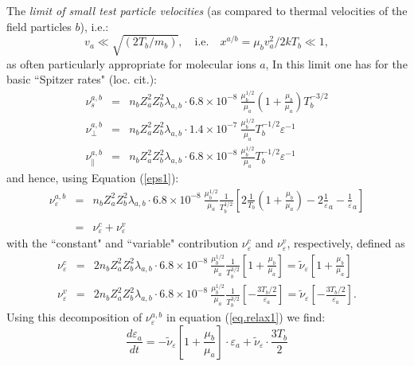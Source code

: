 \vspace{1cm}
The \emph{limit of small test particle velocities} (as compared to thermal velocities of the
field particles $b$), i.e.:
\begin{equation}\label{xab}
v_a\ll \sqrt{(2T_b/m_b)},\quad  \mbox{i.e.} \quad  x^{a/b} = \mu_bv_a^2/2kT_b \ll 1,
\end{equation}
as often particularly
appropriate for molecular ions $a$,
In this limit one has for the basic ``Spitzer
rates" (loc. cit.):
\begin{eqnarray}
\nu_s^{a,b} & = & n_b Z_a^2 Z_b^2\lambda_{a,b}\cdot
6.8 \times 10^{-8}~\frac{\mu_b^{1/2}}{\mu_a} \left(1+\frac{\mu_b}{\mu_a}\right)T_b^{-3/2}\\
\nu_\perp^{a,b} & = & n_b Z_a^2 Z_b^2\lambda_{a,b}\cdot 1.4 \times 10^{-7}~\frac{\mu_b^{1/2}}{\mu_a} T_b^{-1/2}\varepsilon^{-1}  \\
\nu_\parallel^{a,b} & = &  n_b Z_a^2 Z_b^2\lambda_{a,b}\cdot 6.8 \times 10^{-8}~\frac{\mu_b^{1/2}}{\mu_a} T_b^{-1/2}\varepsilon^{-1}
\end{eqnarray}
and hence, using Equation (\ref{eps1}):
\begin{eqnarray}
\nu_\varepsilon^{a,b} &=&  n_b Z_a^2 Z_b^2\lambda_{a,b}\cdot
6.8 \times 10^{-8}~\frac{\mu_b^{1/2}}{\mu_a}\frac{1}{T_b^{1/2}}
\left[2 \frac{1}{T_b}\left(1+\frac{\mu_b}{\mu_a}\right)-
2\frac1\varepsilon_a-\frac1\varepsilon_a\right]\nonumber\\
&& \\
&=&\nu^c_\varepsilon +\nu^v_\varepsilon
\end{eqnarray}
with the ``constant" and ``variable" contribution $\nu^c_\varepsilon$ and $\nu^v_\varepsilon$, respectively, defined as
\begin{eqnarray}
\nu^c_\varepsilon &=& 2 n_b Z_a^2 Z_b^2\lambda_{a,b}\cdot
6.8 \times 10^{-8}~\frac{\mu_b^{1/2}}{\mu_a}\frac{1}{T_b^{3/2}}
\left[1+\frac{\mu_b}{\mu_a}\right] =
\tilde{\nu}_\varepsilon\left[1+\frac{\mu_b}{\mu_a}\right] \\
\nu^v_\varepsilon &=&2 n_b Z_a^2 Z_b^2\lambda_{a,b}\cdot 6.8 \times 10^{-8}~\frac{\mu_b^{1/2}}{\mu_a}\frac{1}{T_b^{3/2}} \left[-\frac{3T_b/2}{\varepsilon_a}\right]=\tilde{\nu}_\varepsilon\left[-\frac{3T_b/2}{\varepsilon_a}\right].
\end{eqnarray}
Using this decomposition of $\nu_\varepsilon^{a,b}$ in equation
(\ref{eq.relax1}) we find:
\begin{equation}\label{eq.relax2}
\frac{d\varepsilon_a}{dt}=-\tilde{\nu}_\varepsilon\left[1+\frac{\mu_b}{\mu_a}\right] \cdot
\varepsilon_a + \tilde{\nu}_\varepsilon\cdot \frac{3T_b}{2}
\end{equation}

